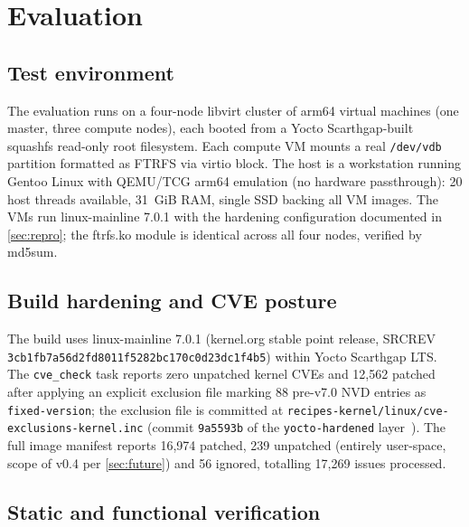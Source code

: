 \section{Evaluation}\label{sec:evaluation}

\subsection{Test environment}

The evaluation runs on a four-node libvirt cluster of arm64
virtual machines (one master, three compute nodes), each booted
from a Yocto Scarthgap-built squashfs read-only root filesystem.
Each compute VM mounts a real \texttt{/dev/vdb} partition formatted
as FTRFS via virtio block. The host is a workstation running
Gentoo Linux with QEMU/TCG arm64 emulation (no hardware
passthrough): 20 host threads available, 31~GiB RAM, single SSD
backing all VM images. The VMs run linux-mainline 7.0.1 with the
hardening configuration documented in
\cref{sec:repro}; the ftrfs.ko module is identical
across all four nodes, verified by md5sum.

\subsection{Build hardening and CVE posture}

The build uses linux-mainline 7.0.1 (kernel.org stable point
release, SRCREV
\texttt{3cb1fb7a56d2fd8011f5282bc170c0d23dc1f4b5}) within Yocto
Scarthgap LTS. The \texttt{cve\_check} task reports zero
unpatched kernel CVEs and 12{,}562 patched after applying an
explicit exclusion file marking 88 pre-v7.0 NVD entries as
\texttt{fixed-version}; the exclusion file is committed at
\texttt{recipes-kernel/linux/cve-exclusions-kernel.inc} (commit
\texttt{9a5593b} of the
\texttt{yocto-hardened} layer~\cite{yocto-hardened-repo}). The
full image manifest reports 16{,}974 patched, 239 unpatched
(entirely user-space, scope of v0.4 per \cref{sec:future})
and 56 ignored, totalling 17{,}269 issues processed.

\subsection{Static and functional verification}

